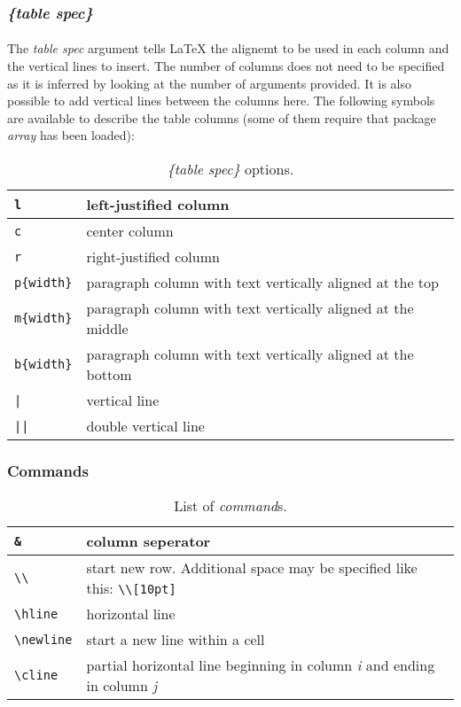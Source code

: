 \subsubsection{\emph{\{table spec\}}}
\paragraph{}
The \emph{table spec} argument tells \LaTeX{} the alignemt to be used in each
column and the vertical lines to insert.\newline
The number of columns does not need to be specified as it is inferred by
looking at the number of arguments provided. It is also possible to add
vertical lines between the columns here. The following symbols are available
to describe the table columns (some of them require that package \emph{array}
has been loaded):
\pagebreak

\begin{table}[htbp]
	\centering
	\begin{tabular}{| l | p{10cm} |}
	\hline
	\texttt{l} & left-justified column \\ \hline
	\texttt{c} & center column \\ \hline
	\texttt{r} & right-justified column \\ \hline
	\verb|p{width}| & paragraph column with text vertically aligned at the top \\ \hline
	\verb|m{width}| & paragraph column with text vertically aligned at the middle \\ \hline
	\verb|b{width}| & paragraph column with text vertically aligned at the bottom \\ \hline
	\texttt{|} & vertical line \\ \hline
	\texttt{||} & double vertical line \\
	\hline
	\end{tabular}
	\caption{\emph{\{table spec\}} options.}
	\label{tabular_specs}
\end{table}

\subsubsection{Commands}
\begin{table}[htbp]
	\centering
	\begin{tabular}{| l | p{10cm} |}
	\hline
	\verb|&| & column seperator \\ \hline
	\verb|\\| & start new row. Additional space may be specified like this: \verb|\\[10pt]| \\ \hline
	\verb|\hline| & horizontal line \\ \hline
	\verb|\newline| & start a new line within a cell \\ \hline
	\verb|\cline| & partial horizontal line beginning in column \emph{i} and ending in column \emph{j} \\ \hline
	\end{tabular}
\caption{List of \emph{command}s.}
\label{tabular_commands}
\end{table}


